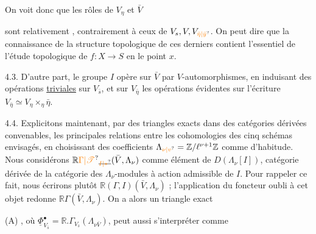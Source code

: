 On voit donc que les rôles de $V_\eta$ et $\bar V$

sont relativement  , contrairement à  ceux de $V_s,V,V_{\unsure{\bar\eta|\bar y}}$.  On peut dire que la   connaissance de la structure topologique de ces derniers contient  l'essentiel de  l'étude topologique de $f:X\longrightarrow S$ en le point $x$.

4.3. D'autre part, le groupe $I$ opère sur $\bar V$  par $V$-automorphismes, en induisant des opérations \uline{triviales} sur $V_{\bar s}$, et sur $V_{\bar\eta}$ les opérations évidentes sur l'écriture $V_{\bar\eta}\simeq V_\eta\times_\eta\bar\eta$.

4.4. Explicitons maintenant, par des triangles exacts dans des catégories dérivées convenables, les principales relations \deleted{\unsure{\&}} entre les cohomologies des cinq schémas envisagés, en choisissant des coefficients $\Lambda_{\unsure{\nu|v}}=\mathbb Z/\ell^{\nu+1}\mathbb Z$ comme d'habitude. Nous considérons $\mathbb R\unsure{\Gamma|\mathscr T}_{\deleted{\unsure{I|*}}}(\bar V,\Lambda_\nu)$ comme élément de $D(\Lambda_\nu[I])$, catégorie dérivée de la catégorie des $\Lambda_\nu$-modules à action admissible de $I$. Pour rappeler ce fait, nous écrirons plutôt $\mathbb R(\Gamma,I)(\bar V,\Lambda_\nu)$ ; l'application du foncteur oubli à cet objet redonne $\mathbb R\Gamma(\bar V,\Lambda_\nu)$. On a alors un triangle exact

 (A)
,
où $\underline\Phi^\bullet_{V_{\bar s}}=\mathbb R.\Gamma_{V_{\bar s}}(\Lambda_{\nu\bar V})$, peut aussi s'interpréter comme

